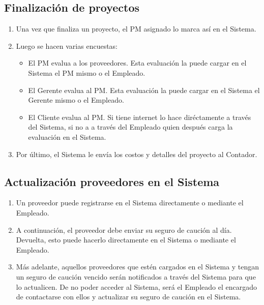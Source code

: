 \subsection{Finalización de proyectos}
\begin{enumerate}
    \item Una vez que finaliza un proyecto, el PM asignado lo marca así en el Sistema.
    \item Luego se hacen varias encuestas:
        \begin{itemize}
            \item El PM evalua a los proveedores. Esta evaluación la puede cargar en el Sistema el PM mismo o el Empleado.
            \item El Gerente evalua al PM. Esta evaluación la puede cargar en el Sistema el Gerente mismo o el Empleado.
            \item El Cliente evalua al PM. Si tiene internet lo hace diréctamente a través del Sistema, si no a a través del Empleado quien después carga la evaluación en el Sistema.
        \end{itemize}
      \item Por último, el Sistema le envía los costos y detalles del proyecto al Contador.
\end{enumerate}

\subsection{Actualización proveedores en el Sistema}
\begin{enumerate}
    \item Un proveedor puede registrarse en el Sistema directamente o mediante el Empleado.
    \item A continuación, el proveedor debe enviar su seguro de caución al día. Devuelta, esto puede hacerlo directamente en el Sistema o mediante el Empleado.
    \item Más adelante, aquellos proveedores que estén cargados en el Sistema y tengan un seguro de caución vencido serán notificados a través del Sistema para que lo actualicen.
      De no poder acceder al Sistema, será el Empleado el encargado de contactarse con ellos y actualizar su seguro de caución en el Sistema.
\end{enumerate}
